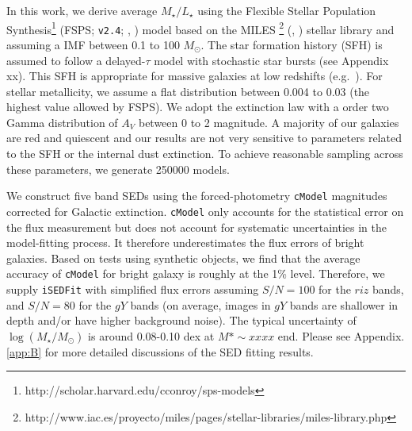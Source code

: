 \documentclass{emulateapj}
\def\msun{$M_\odot$}
\def\cmodel{\texttt{cModel}}
\def\logms{{$\log (M_{\star}/M_{\odot})$}}
\def\m2l{{$M_{\star}/L_{\star}$}}
\newcommand{\song}[1]{\textcolor{magenta}{\textbf{[Song: #1]}}}
\begin{document}
\begin{CJK*}{UTF8}{gbsn}
    In this work, we derive average \m2l{} using the Flexible Stellar Population 
    Synthesis\footnote{http://scholar.harvard.edu/cconroy/sps-models}
    (FSPS; \texttt{v2.4}; \citealt{FSPS}, \citealt{Conroy2010}) model based on the MILES
    \footnote{http://www.iac.es/proyecto/miles/pages/stellar-libraries/miles-library.php}
    (\citealt{MILES1}, \citealt{MILES2}) stellar library and assuming a \citet{Chabrier2003} 
    IMF between 0.1 to 100 \msun. The star formation history (SFH) is assumed to follow a delayed-$\tau$ model with stochastic star bursts (see Appendix xx). This SFH is appropriate for massive galaxies at low redshifts 
    (e.g.\ \citealt{Kauffmann2003}). 
    For stellar metallicity, we assume a flat distribution between 0.004 to 0.03 (the highest value allowed by FSPS). We adopt the \citet{Calzetti2000} extinction law with a order two Gamma 
    distribution of $A_{V}$ between 0 to 2 magnitude. A majority of our galaxies are red and quiescent and our results are 
    not very sensitive to parameters related to the SFH or the internal dust extinction. 
    To achieve reasonable sampling across these parameters, we generate 250000 models. 
    
    We construct five band SEDs using the forced-photometry \cmodel{} magnitudes corrected 
    for Galactic extinction. \cmodel{} only accounts for the statistical error on the flux measurement but does not account for systematic uncertainties in the model-fitting process. It therefore underestimates the flux errors of bright galaxies. Based on tests using synthetic objects, we find that the average accuracy of \cmodel{} for bright galaxy is roughly at the 1\% level. Therefore, we supply \texttt{iSEDFit} with simplified flux errors assuming $S/N = 100$ 
    for the $riz$ bands, and $S/N = 80$ for the $gY$ bands (on average, images in $gY$ bands are 
    shallower in depth and/or have higher background noise).  
    The typical uncertainty of \logms{} is around 0.08-0.10 dex at $M* \sim xxxx$ end. 
    Please see Appendix.\ref{app:B} for more detailed discussions of the SED fitting
    results.  
    
    
   



\end{CJK*}
\end{document}
